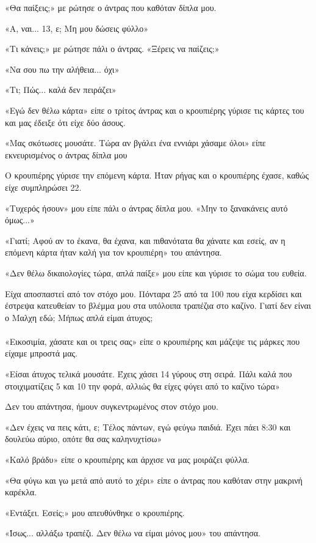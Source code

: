 \documentclass[12pt,twoside, openany]{book}
\begin{document}
«Θα παίξεις;» με ρώτησε ο άντρας που καθόταν δίπλα μου.

«Α, ναι... 13, ε; Μη μου δώσεις φύλλο»

«Τι κάνεις;» με ρώτησε πάλι ο άντρας. «Ξέρεις να παίζεις;»

«Να σου πω την αλήθεια... όχι»

«Τι; Πώς... καλά δεν πειράζει»

«Εγώ δεν θέλω κάρτα» είπε ο τρίτος άντρας και ο κρουπιέρης γύρισε τις κάρτες του και μας έδειξε ότι είχε δύο άσους.

«Μας σκότωσες μουσάτε. Τώρα αν βγάλει ένα εννιάρι χάσαμε όλοι» είπε εκνευρισμένος ο άντρας δίπλα μου

Ο κρουπιέρης γύρισε την επόμενη κάρτα. Ήταν ρήγας και ο κρουπιέρης έχασε, καθώς είχε συμπληρώσει 22.

«Τυχερός ήσουν» μου είπε πάλι ο άντρας δίπλα μου. «Μην το ξανακάνεις αυτό όμως...»

«Γιατί; Αφού αν το έκανα, θα έχανα, και πιθανότατα θα χάνατε και εσείς, αν η επόμενη κάρτα ήταν καλή για τον κρουπιέρη» του απάντησα.

«Δεν θέλω δικαιολογίες τώρα, απλά παίξε» μου είπε και γύρισε το σώμα του ευθεία.

Είχα αποσπαστεί από τον στόχο μου. Πόνταρα 25 από τα 100 που είχα κερδίσει και έστρεψα κατευθείαν το βλέμμα μου στα υπόλοιπα τραπέζια στο καζίνο. Γιατί δεν είναι ο Μαλχη εδώ; Μήπως απλά είμαι άτυχος;\\\\

«Εικοσιμία, χάσατε και οι τρεις σας» είπε ο κρουπιέρης και μάζεψε τις μάρκες που είχαμε μπροστά μας.

«Είσαι άτυχος τελικά μουσάτε. Έχεις χάσει 14 γύρους στη σειρά. Πάλι καλά που στοιχιματίζεις 5 και 10 την φορά, αλλιώς θα είχες φύγει από το καζίνο τώρα»

Δεν του απάντησα, ήμουν συγκεντρωμένος στον στόχο μου.

«Δεν έχεις να πεις κάτι, ε; Τέλος πάντων, εγώ φεύγω παιδιά. Έχει πάει 8:30 και δουλεύω αύριο, οπότε θα σας καληνυχτίσω»

«Καλό βράδυ» είπε ο κρουπιέρης και άρχισε να μας μοιράζει φύλλα.

«Θα φύγω και γω μετά από αυτό το χέρι» είπε ο άντρας που καθόταν στην μακρινή καρέκλα.

«Εντάξει. Εσείς;» μου απευθύνθηκε ο κρουπιέρης.

«Ίσως... αλλάξω τραπέζι. Δεν θέλω να είμαι μόνος μου» του απάντησα.
\end{document}
